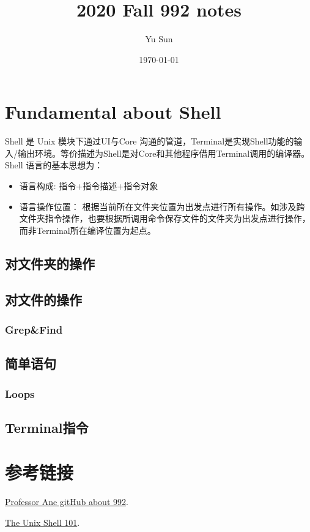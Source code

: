 \documentclass[12pt]{article}
\begin{document}
	\title{2020 Fall 992 notes}
	\author{Yu Sun}
	
	
	\date{\today}
	\maketitle
	\vspace{-1em}
	

	
	\newpage

	\begin{CJK}{UTF8}{gbsn}
		\section{Fundamental about Shell}
		Shell 是 Unix 模块下通过UI与Core 沟通的管道，Terminal是实现Shell功能的输入/输出环境。等价描述为Shell是对Core和其他程序借用Terminal调用的编译器。Shell 语言的基本思想为：
		\begin{itemize}
			\item 语言构成: 指令+指令描述+指令对象
			\item 语言操作位置： 根据当前所在文件夹位置为出发点进行所有操作。如涉及跨文件夹指令操作，也要根据所调用命令保存文件的文件夹为出发点进行操作，而非Terminal所在编译位置为起点。

		\end{itemize}
	
	
		\subsection{对文件夹的操作}
		
		\subsection{对文件的操作}
		\subsubsection{Grep\&Find}
		
		\subsection{简单语句}
		\subsubsection{Loops}
		
		\subsection{Terminal指令}
	
	
	\section{参考链接}
	\noindent [1] \href{http://cecileane.github.io/computingtools/}{Professor Ane gitHub about 992}.\
	
	\noindent [2] \href{http://swcarpentry.github.io/shell-novice/}{The Unix Shell 101}.
	\end{CJK}
	
	

	
	
	
	
	
	

		
	
%	
	
	
	
\end{document}
